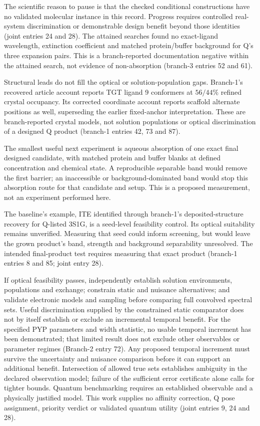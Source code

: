 \documentclass{article}
\begin{document}
The scientific reason to pause is that the checked conditional constructions have no validated molecular instance in this record. Progress requires controlled real-system discrimination or demonstrable design benefit beyond those identities (joint entries 24 and 28). The attained searches found no exact-ligand wavelength, extinction coefficient and matched protein/buffer background for Q's three expansion pairs. This is a branch-reported documentation negative within the attained search, not evidence of non-absorption (branch-3 entries 52 and 61).

Structural leads do not fill the optical or solution-population gaps. Branch-1's recovered article account reports TGT ligand 9 conformers at \(56/44\%\) refined crystal occupancy. Its corrected coordinate account reports scaffold alternate positions as well, superseding the earlier fixed-anchor interpretation. These are branch-reported crystal models, not solution populations or optical discrimination of a designed Q product (branch-1 entries 42, 73 and 87).

The smallest useful next experiment is aqueous absorption of one exact final designed candidate, with matched protein and buffer blanks at defined concentration and chemical state. A reproducible separable band would remove the first barrier; an inaccessible or background-dominated band would stop this absorption route for that candidate and setup. This is a proposed measurement, not an experiment performed here.

The baseline's example, ITE identified through branch-1's deposited-structure recovery for Q-listed 3S1G, is a seed-level feasibility control. Its optical suitability remains unverified. Measuring that seed could inform screening, but would leave the grown product's band, strength and background separability unresolved. The intended final-product test requires measuring that exact product (branch-1 entries 8 and 85; joint entry 28).

If optical feasibility passes, independently establish solution environments, populations and exchange; constrain static and nuisance alternatives; and validate electronic models and sampling before comparing full convolved spectral sets. Useful discrimination supplied by the constrained static comparator does not by itself establish or exclude an incremental temporal benefit. For the specified PYP parameters and width statistic, no usable temporal increment has been demonstrated; that limited result does not exclude other observables or parameter regimes (Branch-2 entry 72). Any proposed temporal increment must survive the uncertainty and nuisance comparison before it can support an additional benefit. Intersection of allowed true sets establishes ambiguity in the declared observation model; failure of the sufficient error certificate alone calls for tighter bounds. Quantum benchmarking requires an established observable and a physically justified model. This work supplies no affinity correction, Q pose assignment, priority verdict or validated quantum utility (joint entries 9, 24 and 28).

\clearpage


\end{document}
